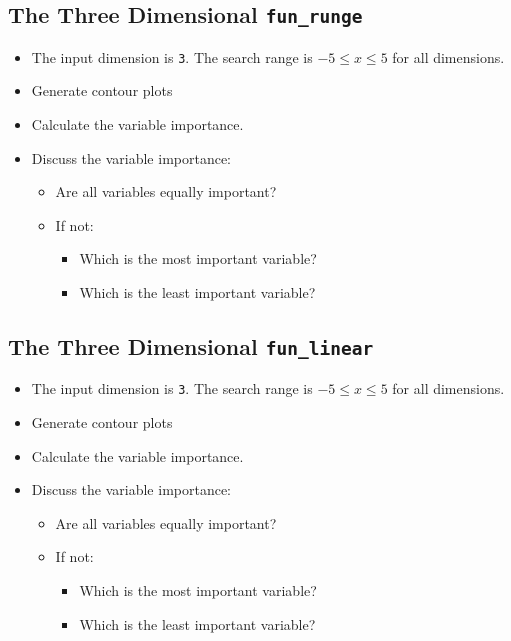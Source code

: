 \documentclass[
  letterpaper,
  DIV=11,
  numbers=noendperiod]{scrreprt}
\providecommand{\tightlist}{%
  \setlength{\itemsep}{0pt}\setlength{\parskip}{0pt}}\usepackage{longtable,booktabs,array}
\begin{document}
\hypertarget{the-three-dimensional-fun_runge}{%
\subsection{\texorpdfstring{The Three Dimensional
\texttt{fun\_runge}}{The Three Dimensional fun\_runge}}\label{the-three-dimensional-fun_runge}}

\begin{itemize}
\tightlist
\item
  The input dimension is \texttt{3}. The search range is
  \(-5 \leq x \leq 5\) for all dimensions.
\item
  Generate contour plots
\item
  Calculate the variable importance.
\item
  Discuss the variable importance:

  \begin{itemize}
  \tightlist
  \item
    Are all variables equally important?
  \item
    If not:

    \begin{itemize}
    \tightlist
    \item
      Which is the most important variable?
    \item
      Which is the least important variable?
    \end{itemize}
  \end{itemize}
\end{itemize}

\hypertarget{the-three-dimensional-fun_linear}{%
\subsection{\texorpdfstring{The Three Dimensional
\texttt{fun\_linear}}{The Three Dimensional fun\_linear}}\label{the-three-dimensional-fun_linear}}

\begin{itemize}
\tightlist
\item
  The input dimension is \texttt{3}. The search range is
  \(-5 \leq x \leq 5\) for all dimensions.
\item
  Generate contour plots
\item
  Calculate the variable importance.
\item
  Discuss the variable importance:

  \begin{itemize}
  \tightlist
  \item
    Are all variables equally important?
  \item
    If not:

    \begin{itemize}
    \tightlist
    \item
      Which is the most important variable?
    \item
      Which is the least important variable?
    \end{itemize}
  \end{itemize}
\end{itemize}
\end{document}

